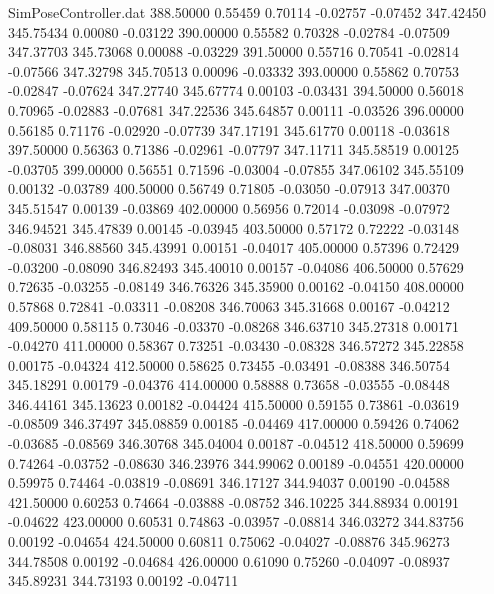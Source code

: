 \begin{filecontents}{SimPoseController.dat}
 388.50000    0.55459    0.70114    -0.02757   -0.07452  347.42450  345.75434    0.00080   -0.03122
 390.00000    0.55582    0.70328    -0.02784   -0.07509  347.37703  345.73068    0.00088   -0.03229
 391.50000    0.55716    0.70541    -0.02814   -0.07566  347.32798  345.70513    0.00096   -0.03332
 393.00000    0.55862    0.70753    -0.02847   -0.07624  347.27740  345.67774    0.00103   -0.03431
 394.50000    0.56018    0.70965    -0.02883   -0.07681  347.22536  345.64857    0.00111   -0.03526
 396.00000    0.56185    0.71176    -0.02920   -0.07739  347.17191  345.61770    0.00118   -0.03618
 397.50000    0.56363    0.71386    -0.02961   -0.07797  347.11711  345.58519    0.00125   -0.03705
 399.00000    0.56551    0.71596    -0.03004   -0.07855  347.06102  345.55109    0.00132   -0.03789
 400.50000    0.56749    0.71805    -0.03050   -0.07913  347.00370  345.51547    0.00139   -0.03869
 402.00000    0.56956    0.72014    -0.03098   -0.07972  346.94521  345.47839    0.00145   -0.03945
 403.50000    0.57172    0.72222    -0.03148   -0.08031  346.88560  345.43991    0.00151   -0.04017
 405.00000    0.57396    0.72429    -0.03200   -0.08090  346.82493  345.40010    0.00157   -0.04086
 406.50000    0.57629    0.72635    -0.03255   -0.08149  346.76326  345.35900    0.00162   -0.04150
 408.00000    0.57868    0.72841    -0.03311   -0.08208  346.70063  345.31668    0.00167   -0.04212
 409.50000    0.58115    0.73046    -0.03370   -0.08268  346.63710  345.27318    0.00171   -0.04270
 411.00000    0.58367    0.73251    -0.03430   -0.08328  346.57272  345.22858    0.00175   -0.04324
 412.50000    0.58625    0.73455    -0.03491   -0.08388  346.50754  345.18291    0.00179   -0.04376
 414.00000    0.58888    0.73658    -0.03555   -0.08448  346.44161  345.13623    0.00182   -0.04424
 415.50000    0.59155    0.73861    -0.03619   -0.08509  346.37497  345.08859    0.00185   -0.04469
 417.00000    0.59426    0.74062    -0.03685   -0.08569  346.30768  345.04004    0.00187   -0.04512
 418.50000    0.59699    0.74264    -0.03752   -0.08630  346.23976  344.99062    0.00189   -0.04551
 420.00000    0.59975    0.74464    -0.03819   -0.08691  346.17127  344.94037    0.00190   -0.04588
 421.50000    0.60253    0.74664    -0.03888   -0.08752  346.10225  344.88934    0.00191   -0.04622
 423.00000    0.60531    0.74863    -0.03957   -0.08814  346.03272  344.83756    0.00192   -0.04654
 424.50000    0.60811    0.75062    -0.04027   -0.08876  345.96273  344.78508    0.00192   -0.04684
 426.00000    0.61090    0.75260    -0.04097   -0.08937  345.89231  344.73193    0.00192   -0.04711

\end{filecontents}
